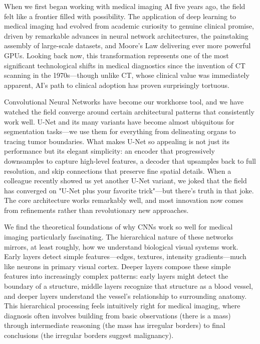 \documentclass[12pt,a4paper]{article}
\begin{document}
When we first began working with medical imaging AI five years ago, the field felt like a frontier filled with possibility. The application of deep learning to medical imaging had evolved from academic curiosity to genuine clinical promise, driven by remarkable advances in neural network architectures, the painstaking assembly of large-scale datasets, and Moore's Law delivering ever more powerful GPUs. Looking back now, this transformation represents one of the most significant technological shifts in medical diagnostics since the invention of CT scanning in the 1970s—though unlike CT, whose clinical value was immediately apparent, AI's path to clinical adoption has proven surprisingly tortuous.

Convolutional Neural Networks have become our workhorse tool, and we have watched the field converge around certain architectural patterns that consistently work well. U-Net \cite{ronneberger2015unet} and its many variants have become almost ubiquitous for segmentation tasks—we use them for everything from delineating organs to tracing tumor boundaries. What makes U-Net so appealing is not just its performance but its elegant simplicity: an encoder that progressively downsamples to capture high-level features, a decoder that upsamples back to full resolution, and skip connections that preserve fine spatial details. When a colleague recently showed us yet another U-Net variant, we joked that the field has converged on "U-Net plus your favorite trick"—but there's truth in that joke. The core architecture works remarkably well, and most innovation now comes from refinements rather than revolutionary new approaches.

We find the theoretical foundations of why CNNs work so well for medical imaging particularly fascinating. The hierarchical nature of these networks mirrors, at least roughly, how we understand biological visual systems work. Early layers detect simple features—edges, textures, intensity gradients—much like neurons in primary visual cortex. Deeper layers compose these simple features into increasingly complex patterns: early layers might detect the boundary of a structure, middle layers recognize that structure as a blood vessel, and deeper layers understand the vessel's relationship to surrounding anatomy. This hierarchical processing feels intuitively right for medical imaging, where diagnosis often involves building from basic observations (there is a mass) through intermediate reasoning (the mass has irregular borders) to final conclusions (the irregular borders suggest malignancy).
\end{document}

